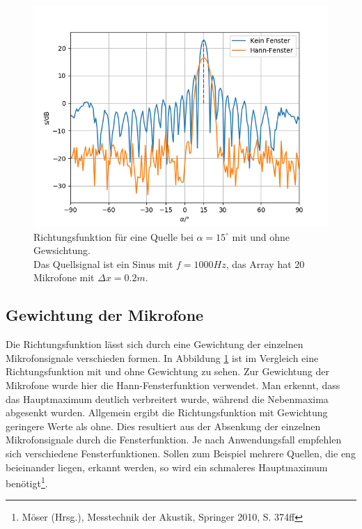 	\begin{figure}[h]
		\begin{center}
			\includegraphics[scale=0.7]{img/bsp_plot_15_beides.png}
			\caption{Richtungsfunktion für eine Quelle bei $\alpha=15^{\circ}$ mit und ohne Gewsichtung. \\
				Das Quellsignal ist ein Sinus mit $f=1000Hz$, das Array hat 20 Mikrofone mit $\Delta x = 0.2m$.}
			\label{fig:bsp_plot}
		\end{center}
	\end{figure}

\subsection{Gewichtung der Mikrofone}

	Die Richtungsfunktion lässt sich durch eine Gewichtung der einzelnen Mikrofonsignale verschieden formen. In Abbildung \ref{fig:bsp_plot} ist im Vergleich eine Richtungsfunktion mit und ohne Gewichtung zu sehen.
	Zur Gewichtung der Mikrofone wurde hier die Hann-Fensterfunktion verwendet. Man erkennt, dass das Hauptmaximum deutlich verbreitert wurde, während die Nebenmaxima abgesenkt wurden.
	Allgemein ergibt die Richtungsfunktion mit Gewichtung geringere Werte als ohne.
	Dies resultiert aus der Absenkung der einzelnen Mikrofonsignale durch die Fensterfunktion.
	Je nach Anwendungsfall empfehlen sich verschiedene Fensterfunktionen. Sollen zum Beispiel mehrere Quellen, die eng beieinander liegen, erkannt werden, so wird ein schmaleres Hauptmaximum benötigt\footnote{Möser (Hrsg.), Messtechnik der Akustik, Springer 2010, S. 374ff}.